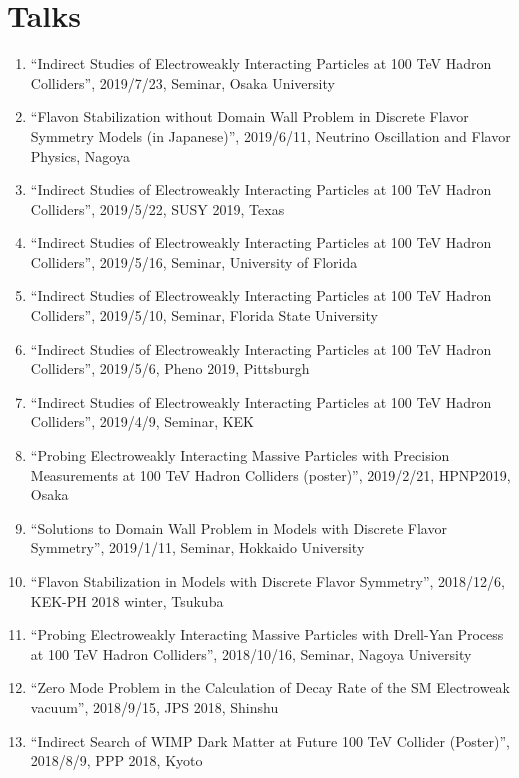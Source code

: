 \documentclass[12pt]{article}
\begin{document}
\vspace{-5mm}


\nocite{*}

\section*{Talks}

\begin{enumerate}
 \item ``Indirect Studies of Electroweakly Interacting Particles at 100 TeV Hadron Colliders'', 2019/7/23, Seminar, Osaka University
 \item ``Flavon Stabilization without Domain Wall Problem in Discrete Flavor Symmetry Models (in Japanese)'', 2019/6/11, Neutrino Oscillation and Flavor Physics, Nagoya
 \item ``Indirect Studies of Electroweakly Interacting Particles at 100 TeV Hadron Colliders'', 2019/5/22, SUSY 2019, Texas
 \item ``Indirect Studies of Electroweakly Interacting Particles at 100 TeV Hadron Colliders'', 2019/5/16, Seminar, University of Florida
 \item ``Indirect Studies of Electroweakly Interacting Particles at 100 TeV Hadron Colliders'', 2019/5/10, Seminar, Florida State University
 \item ``Indirect Studies of Electroweakly Interacting Particles at 100 TeV Hadron Colliders'', 2019/5/6, Pheno 2019, Pittsburgh
 \item ``Indirect Studies of Electroweakly Interacting Particles at 100 TeV Hadron Colliders'', 2019/4/9, Seminar, KEK
 \item ``Probing Electroweakly Interacting Massive Particles with Precision Measurements at 100 TeV Hadron Colliders (poster)'', 2019/2/21, HPNP2019, Osaka
 \item ``Solutions to Domain Wall Problem in Models with Discrete Flavor Symmetry'', 2019/1/11, Seminar, Hokkaido University
 \item ``Flavon Stabilization in Models with Discrete Flavor Symmetry'', 2018/12/6, KEK-PH 2018 winter, Tsukuba
 \item ``Probing Electroweakly Interacting Massive Particles with Drell-Yan Process at 100 TeV Hadron Colliders'', 2018/10/16, Seminar, Nagoya University
 \item ``Zero Mode Problem in the Calculation of Decay Rate of the SM Electroweak vacuum'', 2018/9/15, JPS 2018, Shinshu
 \item ``Indirect Search of WIMP Dark Matter at Future 100 TeV Collider (Poster)'', 2018/8/9, PPP 2018, Kyoto

\end{enumerate}
\end{document}
